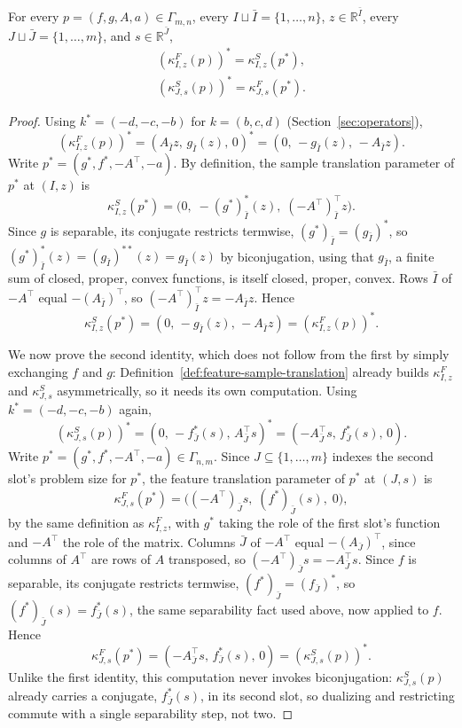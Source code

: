 \begin{proposition}
\label{prop:parameter-equivariance}
For every \(p=(f,g,A,a)\in\Gamma_{m,n}\), every
\(I\sqcup\bar I=\{1,\ldots,n\}\), \(z\in\mathbb R^{\bar I}\), every
\(J\sqcup\bar J=\{1,\ldots,m\}\), and \(s\in\mathbb R^{\bar J}\),
\begin{align*}
        (\kappa^F_{I, z}(p))^* = \kappa^S_{I, z}(p^*),\\
        (\kappa^S_{J, s}(p))^* = \kappa^F_{J, s}(p^*).
\end{align*}
\end{proposition}

\begin{proof}
Using \(k^*=(-d,-c,-b)\) for \(k=(b,c,d)\) (Section~\ref{sec:operators}),
\[
(\kappa^F_{I,z}(p))^*
=
(A_{\bar I}z,\,g_{\bar I}(z),\,0)^*
=
(0,\,-g_{\bar I}(z),\,-A_{\bar I}z).
\]
Write \(p^*=(g^*,f^*,-A^\top,-a)\). By definition, the sample
translation parameter of \(p^*\) at \((I,z)\) is
\[
\kappa^S_{I,z}(p^*)
=
\bigl(0,\;-(g^*)_{\bar I}^{*}(z),\;(-A^\top)_{\bar I}^{\top}z\bigr).
\]
Since \(g\) is separable, its conjugate restricts termwise,
\((g^*)_{\bar I}=(g_{\bar I})^*\), so
\((g^*)_{\bar I}^{*}(z)=(g_{\bar I})^{**}(z)=g_{\bar I}(z)\) by
biconjugation, using that \(g_{\bar I}\), a finite sum of closed,
proper, convex functions, is itself closed, proper, convex. Rows
\(\bar I\) of \(-A^\top\) equal \(-(A_{\bar I})^\top\), so
\((-A^\top)_{\bar I}^\top z=-A_{\bar I}z\). Hence
\[
\kappa^S_{I,z}(p^*)=(0,\,-g_{\bar I}(z),\,-A_{\bar I}z)=(\kappa^F_{I,z}(p))^*.
\]

We now prove the second identity, which does not follow from the first
by simply exchanging \(f\) and \(g\): Definition~\ref{def:feature-sample-translation}
already builds \(\kappa^F_{I,z}\) and \(\kappa^S_{J,s}\) asymmetrically,
so it needs its own computation.
Using \(k^*=(-d,-c,-b)\) again,
\[
(\kappa^S_{J,s}(p))^*
=
(0,\,-f_{\bar J}^{*}(s),\,A_{\bar J}^{\top}s)^*
=
(-A_{\bar J}^{\top}s,\,f_{\bar J}^{*}(s),\,0).
\]
Write \(p^*=(g^*,f^*,-A^\top,-a)\in\Gamma_{n,m}\). Since \(J\subseteq
\{1,\ldots,m\}\) indexes the second slot's problem size for \(p^*\), the
feature translation parameter of \(p^*\) at \((J,s)\) is
\[
\kappa^F_{J,s}(p^*)
=
\bigl((-A^\top)_{\bar J}s,\;(f^*)_{\bar J}(s),\;0\bigr),
\]
by the same definition as \(\kappa^F_{I,z}\), with \(g^*\) taking the
role of the first slot's function and \(-A^\top\) the role of the
matrix. Columns \(\bar J\) of \(-A^\top\) equal \(-(A_{\bar J})^\top\),
since columns of \(A^\top\) are rows of \(A\) transposed, so
\((-A^\top)_{\bar J}s=-A_{\bar J}^\top s\). Since \(f\) is separable, its
conjugate restricts termwise, \((f^*)_{\bar J}=(f_{\bar J})^*\), so
\((f^*)_{\bar J}(s)=f_{\bar J}^{*}(s)\), the same separability fact used
above, now applied to \(f\).
Hence
\[
\kappa^F_{J,s}(p^*)=(-A_{\bar J}^{\top}s,\,f_{\bar J}^{*}(s),\,0)=(\kappa^S_{J,s}(p))^*.
\]
Unlike the first identity, this computation never invokes
biconjugation: \(\kappa^S_{J,s}(p)\) already carries a conjugate,
\(f_{\bar J}^*(s)\), in its second slot, so dualizing and restricting
commute with a single separability step, not two.
\end{proof}


